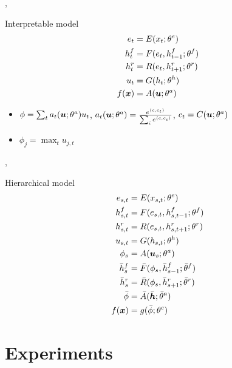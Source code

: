 \begin{frame}{\softmaxi, \maxi}
  \begin{block}{Interpretable model}
    \begin{align*}
  e_t &= E(x_t;\theta^e)\\
  h^f_t &= F(e_t,h^f_{t-1};\theta^f)\\
  h^r_t &= R(e_t,h^r_{t+1};\theta^r)\\
  u_t &= G(h_t;\theta^h)\\
  f(\bm{x}) &= A(\bm{u};\theta^a)
\end{align*}
  \end{block}
  \begin{itemize}
  \item
    $\phi = \sum_t a_t(\bm{u};\theta^a) u_t$, $a_t(\bm{u};\theta^a) = \frac{e^{\langle c, c_t\rangle}}
    {\sum_i{e^{\langle c, c_i\rangle}}}$, $c_t=C(\bm{u};\theta^a)$
\item $\phi_j = \max_t u_{j,t}$
\end{itemize}
\end{frame}

\begin{frame}{\softmaxh, \maxh}
  \begin{block}{Hierarchical model}
    \begin{align*}
  e_{s,t} &= E(x_{s,t};\theta^e)\\
  h^f_{s,t} &= F(e_{s,t},h^f_{s,t-1};\theta^{f})\\
  h^r_{s,t} &= R(e_{s,t},h^r_{s,t+1};\theta^{r})\\
  u_{s,t} &= G(h_{s,t};\theta^{h})\\
  \phi_s &= A(\bm{u}_s;\theta^{a})\\
  \bar{h}^{f}_{s} &= \bar{F}(\phi_{s},\bar{h}^{f}_{s-1};\bar{\theta}^{f})\\
  \bar{h}^{r}_{s} &= \bar{R}(\phi_{s},\bar{h}^{r}_{s+1};\bar{\theta}^{r})\\
  \bar{\phi} &= \bar{A}(\bar{\bm{h}};\bar{\theta}^{a})\\
  f(\bm{x}) &= g(\bar{\phi};\theta^c)
\end{align*}
  \end{block}
\end{frame}

\section{Experiments}



